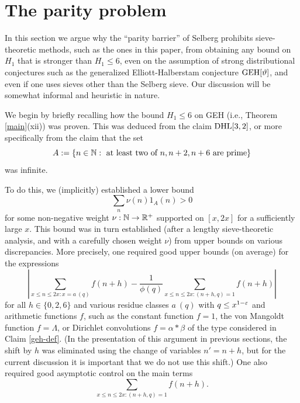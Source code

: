 \section{The parity problem}\label{parity-sec}

In this section we argue why the ``parity barrier'' of Selberg \cite{selberg} prohibits sieve-theoretic methods, such as the ones in this paper, from obtaining any bound on $H_1$ that is stronger than $H_1 \leq 6$, even on the assumption of strong distributional conjectures such as the generalized Elliott-Halberstam conjecture $\operatorname*{GEH}[\vartheta]$, and even if one uses sieves other than the Selberg sieve.  Our discussion will be somewhat informal and heuristic in nature.

We begin by briefly recalling how the bound $H_1 \leq 6$ on GEH (i.e., Theorem \ref{main}(xii)) was proven.  This was deduced from the claim $\operatorname*{DHL}[3,2]$, or more specifically from the claim that the set
\begin{equation}\label{A-def}
A := \{ n \in \mathbb{N}: \hbox{ at least two of } n, n+2, n+6 \hbox{ are prime} \}
\end{equation}
was infinite.

To do this, we (implicitly) established a lower bound
$$ \sum_n \nu(n) 1_A(n) > 0$$
for some non-negative weight $\nu: \mathbb{N} \to \mathbb{R}^+$ supported on $[x,2x]$ for a sufficiently large $x$.  This bound was in turn established (after a lengthy sieve-theoretic analysis, and with a carefully chosen weight $\nu$) from upper bounds on various discrepancies.  More precisely, one required good upper bounds (on average) for the expressions
\begin{equation}\label{flip}
 \left|\sum_{x \leq n \leq 2x: x = a\ (q)} f(n+h) - \frac{1}{\phi(q)} \sum_{x \leq n \leq 2x: (n+h,q)=1} f(n+h)\right|
\end{equation}
for all $h \in \{0,2,6\}$ and various residue classes $a\ (q)$ with $q \leq x^{1-\varepsilon}$ and arithmetic functions $f$, such as the constant function $f=1$, the von Mangoldt function $f = \Lambda$, or Dirichlet convolutions $f = \alpha \ast \beta$ of the type considered in Claim \ref{geh-def}.  (In the presentation of this argument in previous sections, the shift by $h$ was eliminated using the change of variables $n' = n+h$, but for the current discussion it is important that we do not use this shift.)  One also required good asymptotic control on the main terms
\begin{equation}\label{flop}
\sum_{x \leq n \leq 2x: (n+h,q)=1} f(n+h).
\end{equation}

